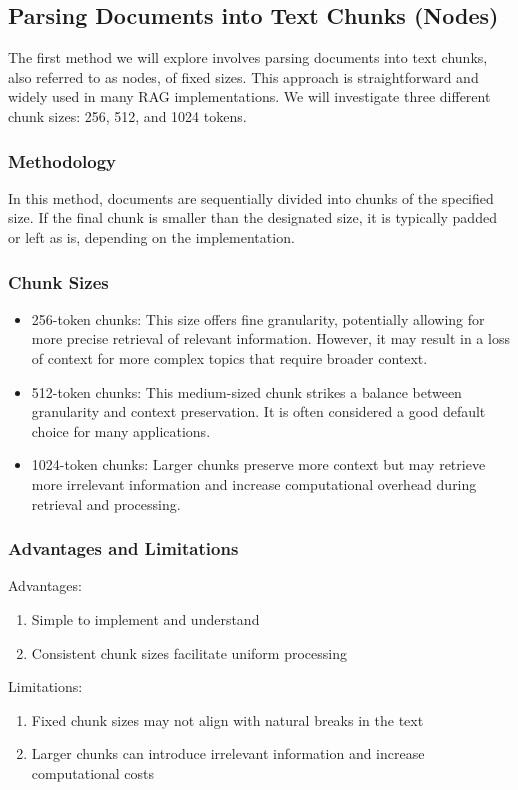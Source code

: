 \subsection{Parsing Documents into Text Chunks (Nodes)}\label{subsec:parsing-documents-into-text-chunks}
The first method we will explore involves parsing documents into text chunks, also referred to as nodes, of fixed sizes.
This approach is straightforward and widely used in many RAG implementations.
We will investigate three different chunk sizes: 256, 512, and 1024 tokens.
\subsubsection{Methodology}
In this method, documents are sequentially divided into chunks of the specified size.
If the final chunk is smaller than the designated size, it is typically padded or left as is, depending on the implementation.
\subsubsection{Chunk Sizes}
\begin{itemize}
    \item 256-token chunks: This size offers fine granularity, potentially allowing for more precise retrieval of relevant information. However, it may result in a loss of context for more complex topics that require broader context.
    \item 512-token chunks: This medium-sized chunk strikes a balance between granularity and context preservation. It is often considered a good default choice for many applications.
    \item 1024-token chunks: Larger chunks preserve more context but may retrieve more irrelevant information and increase computational overhead during retrieval and processing.
\end{itemize}
\subsubsection{Advantages and Limitations}
Advantages:
\begin{enumerate}
    \item Simple to implement and understand
    \item Consistent chunk sizes facilitate uniform processing
\end{enumerate}
Limitations:
\begin{enumerate}
    \item Fixed chunk sizes may not align with natural breaks in the text
    \item Larger chunks can introduce irrelevant information and increase computational costs
\end{enumerate}
